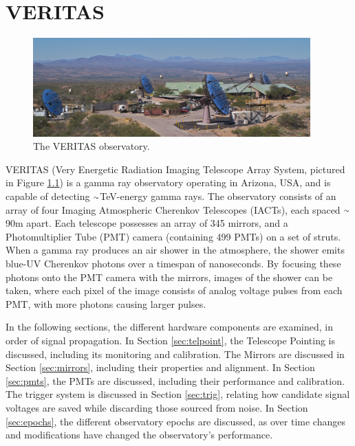 \cleartooddpage[\thispagestyle{empty}]
\chapter{VERITAS}\label{chapter:veritas}

\begin{figure}[ht]
  \centering
  \includegraphics[width=0.95\textwidth]{images/veritas_array_v6}
  \caption[VERITAS Array]{
    The VERITAS observatory.}
  \label{fig:veritasarray}
\end{figure}

VERITAS (Very Energetic Radiation Imaging Telescope Array System, pictured in Figure \ref{fig:veritasarray}) is a gamma ray observatory operating in Arizona, USA, and is capable of detecting $\nicetilde$TeV-energy gamma rays.
The observatory consists of an array of four Imaging Atmospheric Cherenkov Telescopes (IACTs), each spaced $\nicetilde$90m apart.
Each telescope possesses an array of 345 mirrors, and a Photomultiplier Tube (PMT) camera (containing 499 PMTs) on a set of struts.
When a gamma ray produces an air shower in the atmosphere, the shower emits blue-UV Cherenkov photons over a timespan of nanoseconds.
By focusing these photons onto the PMT camera with the mirrors, images of the shower can be taken, where each pixel of the image consists of analog voltage pulses from each PMT, with more photons causing larger pulses.


In the following sections, the different hardware components are examined, in order of signal propagation.
In Section \ref{sec:telpoint}, the Telescope Pointing is discussed, including its monitoring and calibration.
The Mirrors are discussed in Section \ref{sec:mirrors}, including their properties and alignment.
In Section \ref{sec:pmts}, the PMTs are discussed, including their performance and calibration.
The trigger system is discussed in Section \ref{sec:trig}, relating how candidate signal voltages are saved while discarding those sourced from noise.
In Section \ref{sec:epochs}, the different observatory epochs are discussed, as over time changes and modifications have changed the observatory's performance.


